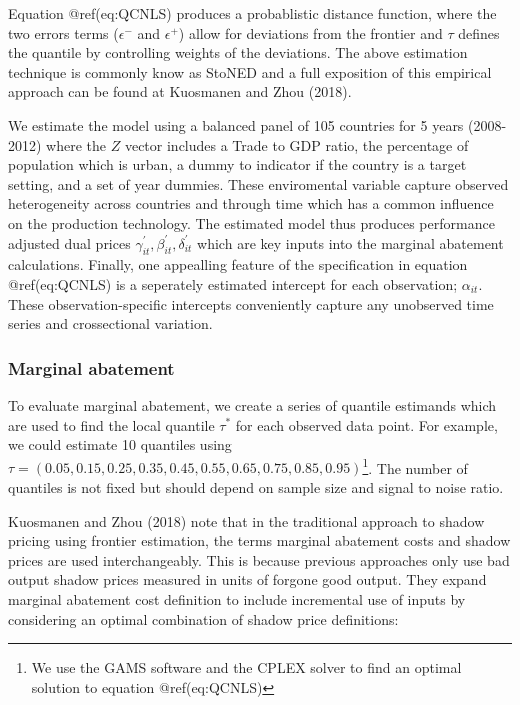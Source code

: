 \documentclass[
  10pt,
]{article}
\begin{document}
Equation @ref(eq:QCNLS) produces a probablistic distance function, where
the two errors terms (\(\epsilon^-\) and \(\epsilon^+\)) allow for
deviations from the frontier and \(\tau\) defines the quantile by
controlling weights of the deviations. The above estimation technique is
commonly know as StoNED and a full exposition of this empirical approach
can be found at Kuosmanen and Zhou (2018).

We estimate the model using a balanced panel of 105 countries for 5
years (2008-2012) where the \(Z\) vector includes a Trade to GDP ratio,
the percentage of population which is urban, a dummy to indicator if the
country is a target setting, and a set of year dummies. These
enviromental variable capture observed heterogeneity across countries
and through time which has a common influence on the production
technology. The estimated model thus produces performance adjusted dual
prices \(\gamma^{'}_{it},\beta^{'}_{it} ,\delta^{'}_{it}\) which are key
inputs into the marginal abatement calculations. Finally, one appealling
feature of the specification in equation @ref(eq:QCNLS) is a seperately
estimated intercept for each observation; \(\alpha_{it}\). These
observation-specific intercepts conveniently capture any unobserved time
series and crossectional variation.

\hypertarget{marginal-abatement}{%
\subsubsection{Marginal abatement}\label{marginal-abatement}}

To evaluate marginal abatement, we create a series of quantile estimands
which are used to find the local quantile \(\tau^{*}\) for each observed
data point. For example, we could estimate 10 quantiles using
\(\tau=(0.05,0.15,0.25,0.35,0.45,0.55,0.65,0.75,0.85,0.95)\)\footnote{We
  use the GAMS software and the CPLEX solver to find an optimal solution
  to equation @ref(eq:QCNLS)}. The number of quantiles is not fixed but
should depend on sample size and signal to noise ratio.

Kuosmanen and Zhou (2018) note that in the traditional approach to
shadow pricing using frontier estimation, the terms marginal abatement
costs and shadow prices are used interchangeably. This is because
previous approaches only use bad output shadow prices measured in units
of forgone good output. They expand marginal abatement cost definition
to include incremental use of inputs by considering an optimal
combination of shadow price definitions:
\end{document}
